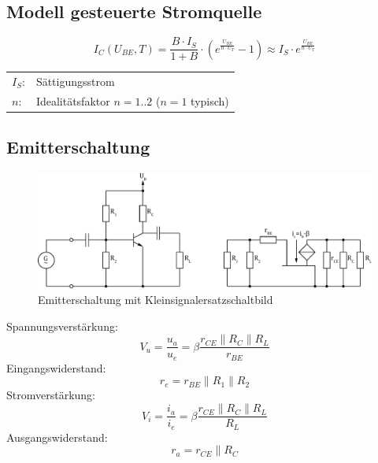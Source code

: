 \subsection{Modell gesteuerte Stromquelle}
\[ I_C(U_{BE}, T) = \frac{B \cdot I_S}{1 + B} 
\cdot \left(e^{\frac{U_{BE}}{n \cdot U_T}} - 1\right) 
\approx I_S \cdot e^{\frac{U_{BE}}{n \cdot U_T}} \]
\begin{tabular}{@{}ll}
  $I_S$:	    & Sättigungsstrom \\
  $n$:	        & Idealitätsfaktor $n = 1..2$ ($n = 1$ typisch) \\
\end{tabular}

\subsection{Emitterschaltung}
\begin{figure}[h!]
	\centering
	\includegraphics[width = \linewidth]{trans_emitter.pdf}
	\caption{Emitterschaltung mit Kleinsignalersatzschaltbild}
	\label{trans:emitterschaltung}
\end{figure}
\noindent
Spannungsverstärkung:
\[
	V_u = \frac{u_a}{u_e} = \beta \frac{r_{CE} \parallel R_C \parallel R_L}{r_{BE}}
\]
Eingangswiderstand:
\[
	r_e = r_{BE} \parallel R_1 \parallel R_2
\]
Stromverstärkung:
\[
	V_i = \frac{i_a}{i_e} = \beta \frac{r_{CE} \parallel R_C \parallel R_L}{R_L}
\]
Ausgangswiderstand:
\[
	r_a = r_{CE} \parallel R_C
\]

\newpage
